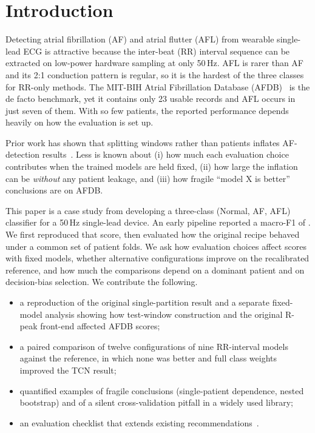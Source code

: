 \documentclass[conference,a4paper]{IEEEtran}
\begin{document}
\section{Introduction}
Detecting atrial fibrillation (AF) and atrial flutter (AFL) from wearable single-lead ECG is attractive because the inter-beat
(RR) interval sequence can be extracted on low-power hardware sampling at only 50\,Hz. AFL is rarer than AF and its 2:1
conduction pattern is regular, so it is the hardest of the three classes for RR-only methods. The MIT-BIH Atrial Fibrillation
Database (AFDB)~\cite{moody1983afdb,goldberger2000physionet} is the de facto benchmark, yet it contains only 23 usable records
and AFL occurs in just seven of them. With so few patients, the reported performance depends heavily on how the evaluation is
set up.

Prior work has shown that splitting windows rather than patients inflates AF-detection results~\cite{dechazal2004,
butkuviene2021,domazetoski2022}. Less is known about (i) how much each evaluation choice contributes when the trained models
are held fixed, (ii) how large the inflation can be \emph{without} any patient leakage, and (iii) how fragile ``model X is
better'' conclusions are on AFDB.

This paper is a case study from developing a three-class (Normal, AF, AFL) classifier for a 50\,Hz single-lead device. An
early pipeline reported a macro-F1 of \mfA{}. We first reproduced that score, then evaluated how the original recipe behaved
under a common set of patient folds. We ask how evaluation choices affect scores with fixed models, whether alternative
configurations improve on the recalibrated reference, and how much the comparisons depend on a dominant patient and on
decision-bias selection. We contribute the following.
\begin{itemize}
\item a reproduction of the original single-partition result and a separate fixed-model analysis showing how test-window
construction and the original R-peak front-end affected AFDB scores;
\item a paired comparison of twelve configurations of nine RR-interval models against the reference, in which none was better
and full class weights improved the TCN result;
\item quantified examples of fragile conclusions (single-patient dependence, nested bootstrap) and of a silent
cross-validation pitfall in a widely used library;
\item an evaluation checklist that extends existing recommendations~\cite{butkuviene2021,collins2024tripodai}.
\end{itemize}
\end{document}
